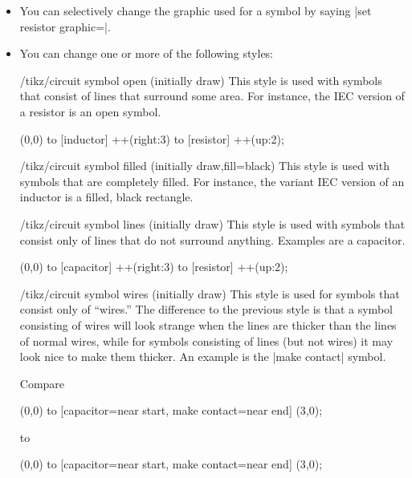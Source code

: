 \begin{itemize}
\begin{codeexample}[]
\end{codeexample}
\item You can selectively change the graphic used for a symbol
  by saying |set resistor graphic=|.
\item You can change one or more of the following styles:
  \begin{stylekey}{/tikz/circuit symbol open (initially draw)}
    This style is used with symbols that consist of lines that
    surround some area. For instance, the IEC version of a resistor is
    an open symbol.
\begin{codeexample}[]
\tikz [circuit ee IEC,
       circuit symbol open/.style={thick,draw,fill=yellow}]
  \draw (0,0) to [inductor] ++(right:3) to [resistor] ++(up:2);
\end{codeexample}
  \end{stylekey}
  \begin{stylekey}{/tikz/circuit symbol filled (initially {draw,fill=black})}
    This style is used with symbols that are completely filled. For
    instance, the variant IEC version of an inductor is a filled,
    black rectangle.
  \end{stylekey}
  \begin{stylekey}{/tikz/circuit symbol lines (initially draw)}
    This style is used with symbols that consist only of lines that do
    not surround anything. Examples are a capacitor.
\begin{codeexample}[]
\tikz [circuit ee IEC,
       circuit symbol lines/.style={thick,draw=red}]
  \draw (0,0) to [capacitor] ++(right:3) to [resistor] ++(up:2);
\end{codeexample}
  \end{stylekey}
  \begin{stylekey}{/tikz/circuit symbol wires (initially draw)}
    This style is used for symbols that consist only of ``wires.'' The
    difference to the previous style is that a symbol consisting of
    wires will look strange when the lines are thicker than the lines
    of normal wires, while for symbols consisting of lines (but not
    wires) it may look nice to make them thicker. An example is the
    |make contact| symbol.

    Compare
\begin{codeexample}[]
\tikz [circuit ee IEC,circuit symbol lines/.style={draw,very thick}]
  \draw (0,0) to [capacitor={near start},
                  make contact={near end}] (3,0);
\end{codeexample}
    to
\begin{codeexample}[]
\tikz [circuit ee IEC,circuit symbol wires/.style={draw,very thick}]
  \draw (0,0) to [capacitor={near start},
                  make contact={near end}] (3,0);
\end{codeexample}
  \end{stylekey}
\end{itemize}

